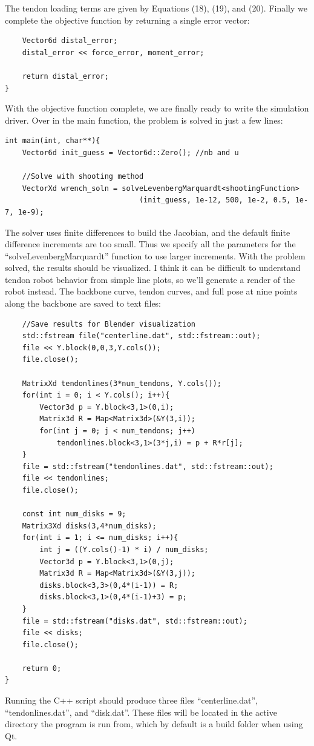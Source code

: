\documentclass[12pt]{article}
\begin{document}
The tendon loading terms are given by Equations (18), (19), and (20). Finally we complete the objective function by returning a single error vector:
\begin{lstlisting}
    Vector6d distal_error;
    distal_error << force_error, moment_error;

    return distal_error;
}
\end{lstlisting}

With the objective function complete, we are finally ready to write the simulation driver. Over in the main function, the problem is solved in just a few lines:
\begin{lstlisting}
int main(int, char**){
    Vector6d init_guess = Vector6d::Zero(); //nb and u

    //Solve with shooting method
    VectorXd wrench_soln = solveLevenbergMarquardt<shootingFunction>
                               (init_guess, 1e-12, 500, 1e-2, 0.5, 1e-7, 1e-9);
\end{lstlisting}
The solver uses finite differences to build the Jacobian, and the default finite difference increments are too small. Thus we specify all the parameters for the ``solveLevenbergMarquardt'' function to use larger increments. With the problem solved, the results should be visualized. I think it can be difficult to understand tendon robot behavior from simple line plots, so we'll generate a render of the robot instead. The backbone curve, tendon curves, and full pose at nine points along the backbone are saved to text files:
\begin{lstlisting}
    //Save results for Blender visualization
    std::fstream file("centerline.dat", std::fstream::out);
    file << Y.block(0,0,3,Y.cols());
    file.close();

    MatrixXd tendonlines(3*num_tendons, Y.cols());
    for(int i = 0; i < Y.cols(); i++){
        Vector3d p = Y.block<3,1>(0,i);
        Matrix3d R = Map<Matrix3d>(&Y(3,i));
        for(int j = 0; j < num_tendons; j++)
            tendonlines.block<3,1>(3*j,i) = p + R*r[j];
    }
    file = std::fstream("tendonlines.dat", std::fstream::out);
    file << tendonlines;
    file.close();
		
    const int num_disks = 9;
    Matrix3Xd disks(3,4*num_disks);
    for(int i = 1; i <= num_disks; i++){
        int j = ((Y.cols()-1) * i) / num_disks;
        Vector3d p = Y.block<3,1>(0,j);
        Matrix3d R = Map<Matrix3d>(&Y(3,j));
        disks.block<3,3>(0,4*(i-1)) = R;
        disks.block<3,1>(0,4*(i-1)+3) = p;
    }
    file = std::fstream("disks.dat", std::fstream::out);
    file << disks;
    file.close();

    return 0;
}
\end{lstlisting}
Running the C++ script should produce three files ``centerline.dat'', ``tendonlines.dat'', and ``disk.dat''. These files will be located in the active directory the program is run from, which by default is a build folder when using Qt.
\end{document}
